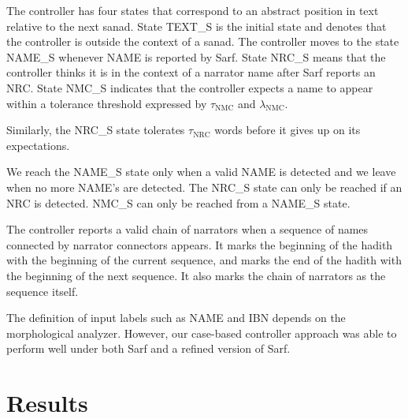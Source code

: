 \documentclass[11pt,letterpaper]{article}
\begin{document}
The controller has four states that correspond to 
an abstract position in text relative to the next sanad. 
State TEXT\_S is the initial state and denotes that
the controller is outside the context of a sanad.
The controller moves to the state NAME\_S whenever
NAME is reported by Sarf.
State NRC\_S means that the controller thinks it is in the context
of a narrator name after Sarf reports an NRC.
State NMC\_S
indicates that the controller expects a name to appear within 
a tolerance threshold expressed by 
$\tau_{\mbox{NMC}}$ and $\lambda_{\mbox{NMC}}$.

\begin{figure}[tb!]
\end{figure}

Similarly, the NRC\_S state tolerates $\tau_{\mbox{NRC}}$ words 
before it gives up on its expectations. 

We reach the NAME\_S state only when a
valid NAME is detected and we leave when no more NAME's are detected. 
The NRC\_S state can only be reached if an NRC is detected.
NMC\_S can only be reached from a NAME\_S state.

The controller reports a valid chain of narrators when a sequence of names
connected by narrator connectors appears. 
It marks the beginning of the hadith with the beginning of the current sequence,
and marks the end of the hadith with the beginning of the next sequence. 
It also marks the chain of narrators as the sequence itself. 

The definition of input labels such as NAME and IBN depends on the 
morphological analyzer. 
However, our case-based controller approach was able to perform well
under both Sarf and a refined version of Sarf.


\section{Results}
\label{sec:results}
\end{document}
